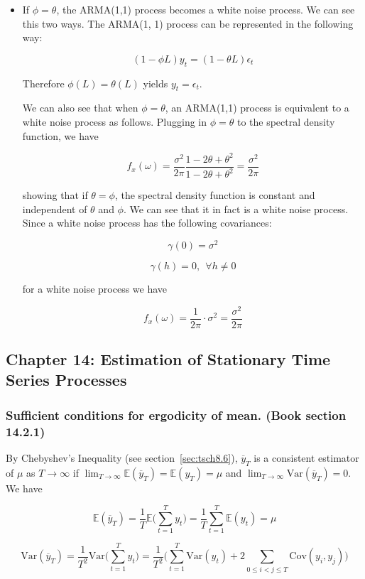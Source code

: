 \documentclass{article}
\newcommand{\E}{\mathbb{E}}
\newcommand{\Var}{\mathrm{Var}}
\newcommand{\Cov}{\mathrm{Cov}}
\begin{document}
\begin{itemize}
\item If \(\phi = \theta\), the ARMA(1,1) process becomes a white noise process. We can see this two ways. The ARMA(1, 1) process can be represented in the following way:

\[
(1 - \phi L)y_t = (1 - \theta L) \epsilon_t
\]

Therefore \(\phi(L) = \theta(L)\) yields \(y_t = \epsilon_t\). 


We can also see that when \(\phi = \theta\), an ARMA(1,1) process is equivalent to a white noise process as follows. Plugging in \(\phi = \theta\) to the spectral density function, we have

\[
f_x(\omega) = \frac{\sigma^2}{2\pi} \frac{1 - 2\theta + \theta^2}{1 -2\theta + \theta^2} = \frac{\sigma^2}{2\pi}
\]

showing that if \(\theta = \phi\), the spectral density function is constant and independent of \(\theta\) and \(\phi \). We can see that it in fact is a white noise process. Since a white noise process has the following covariances:

\[
\gamma(0) = \sigma^2
\]

\[
\gamma(h) =0, \ \ \forall h \neq 0
\]

for a white noise process we have

\[
f_x(\omega) = \frac{1}{2\pi} \cdot \sigma^2 = \frac{\sigma^2}{2 \pi}
\]


\end{itemize}

\subsection{Chapter 14: Estimation of Stationary Time Series Processes}

\subsubsection{Sufficient conditions for ergodicity of mean. (Book section 14.2.1)} By Chebyshev's Inequality (see section~\ref{sec:tsch8.6}), \(\overline{y}_T\) is a consistent estimator of \(\mu\) as \(T \to \infty\) if \(\lim_{T \to \infty} \E(\overline{y}_T) = \E(y_T) = \mu\) and \(\lim_{T \to \infty} \Var(\overline{y}_T) = 0\). We have

\[
\E(\overline{y}_T) = \frac{1}{T} \E \bigg( \sum_{t=1}^T y_t \bigg) = \frac{1}{T}  \sum_{t=1}^T \E (y_t) = \mu
\]

\[
\Var(\overline{y}_T) = \frac{1}{T^2} \Var \bigg( \sum_{t=1}^T y_t \bigg) = \frac{1}{T^2} \bigg(\sum_{t=1}^T  \Var(y_t) + 2 \sum_{0 \leq i < j \leq T } \Cov(y_i, y_j)   \bigg)
\]
\end{document}
